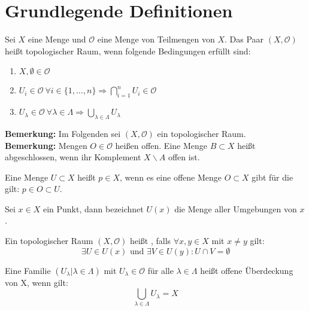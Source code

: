 \chapter{Grundlegende Definitionen}

\begin{Def}
	Sei \(X\) eine Menge und \( \mathcal{O} \) eine Menge von Teilmengen von \(X\). Das Paar \((X,\mathcal{O})\) heißt topologischer Raum, wenn folgende Bedingungen erfüllt sind:
	\begin{enumerate}
		\item \( X, \emptyset \in \mathcal{O} \) 
		\item \( U_{i} \in \mathcal{O} \ \forall  i \in \{1, \dots, n\} 
			\Rightarrow \bigcap_{i=1}^n U_{i} \in  \mathcal{O} \)
		\item \( U_{\lambda} \in \mathcal{O} \ \forall \lambda \in \Lambda \Rightarrow \bigcup_{\lambda \in \Lambda} U_{\lambda} \)
	\end{enumerate}
\end{Def}
{\bf Bemerkung:} Im Folgenden sei \((X,\mathcal{O})\) ein topologischer Raum.
\\
{\bf Bemerkung:} Mengen \(O \in \mathcal{O} \) heißen offen. Eine Menge \(B \subset X\) heißt abgeschlossen, wenn ihr Komplement \( X \backslash A\) offen ist.

\begin{Def} 
	Eine Menge \(U \subset X\) heißt  \(p \in X\), wenn es eine offene Menge \(O \subset X\) gibt für die gilt: 
	\(p \in O \subset U\).
\end{Def}

\begin{Def}
	Sei \(x \in X\) ein Punkt, dann bezeichnet \(U(x)\) die Menge aller Umgebungen von \(x\). 
\end{Def}

\begin{Def}[hausdorffsch]
	Ein topologischer Raum \((X,\mathcal{O})\) heißt , falls \( \forall x,y \in X\) mit \(x\ne y\) gilt:
	\[\exists U \in U(x) \mbox{ und } \exists V \in U(y) : U \cap V = \emptyset \]
\end{Def}

\begin{Def}
	Eine Familie \( (U_{\lambda} | \lambda \in \Lambda) \) mit \(U_{\lambda} \in \mathcal{O} \) für alle \( \lambda \in \Lambda \) heißt 	offene Überdeckung von X, wenn gilt:
	\[ \bigcup_{\lambda \in \Lambda } U_{\lambda} = X \]
\end{Def}

	



